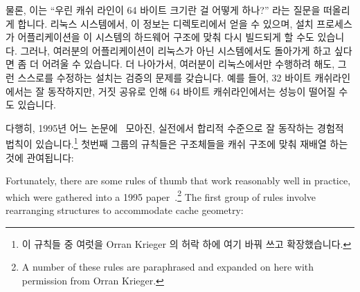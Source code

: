 물론, 이는 ``우린 캐쉬 라인이 64 바이트 크기란 걸 어떻게 하나?'' 라는 질문을
떠올리게 합니다.
리눅스 시스템에서, 이 정보는 
디렉토리에서 얻을 수 있으며, 설치 프로세스가 어플리케이션을 이 시스템의
하드웨어 구조에 맞춰 다시 빌드되게 할 수도 있습니다.
그러나, 여러분의 어플리케이션이 리눅스가 아닌 시스템에서도 돌아가게 하고 싶다면
좀 더 어려울 수 있습니다.
더 나아가서, 여러분이 리눅스에서만 수행하려 해도, 그런 스스로를 수정하는 설치는
검증의 문제를 갖습니다.
예를 들어, 32 바이트 캐쉬라인에서는 잘 동작하지만, 거짓 공유로 인해 64 바이트
캐쉬라인에서는 성능이 떨어질 수도 있습니다.

다행히, 1995년 어느 논문에~\cite{BenjaminGamsa95a} 모아진, 실전에서 합리적
수준으로 잘 동작하는 경험적 법칙이 있습니다.\footnote{
	이 규칙들 중 여럿을 Orran Krieger 의 허락 하에 여기 바꿔 쓰고
	확장했습니다.}
첫번째 그룹의 규칙들은 구조체들을 캐쉬 구조에 맞춰 재배열 하는 것에 관여됩니다:

\iffalse

Fortunately, there are some rules of thumb that work reasonably well in
practice, which were gathered into a 1995
paper~\cite{BenjaminGamsa95a}.\footnote{
	A number of these rules are paraphrased and expanded on here
	with permission from Orran Krieger.}
The first group of rules involve rearranging structures to accommodate
cache geometry:

